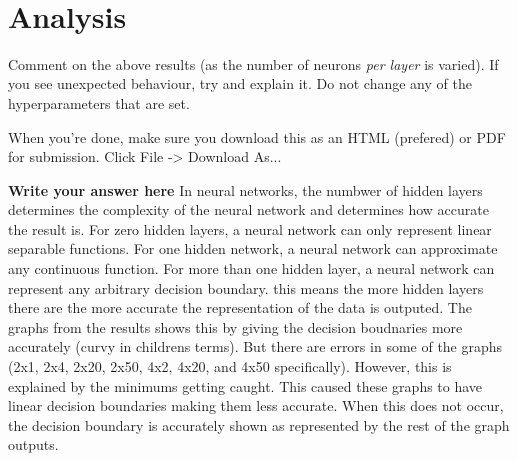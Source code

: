 \documentclass[11pt]{article}
\begin{document}
    \begin{center}
    \end{center}
    { \hspace*{\fill} \\}
    
    \section{Analysis}\label{analysis}

Comment on the above results (as the number of neurons \emph{per layer}
is varied). If you see unexpected behaviour, try and explain it. Do not
change any of the hyperparameters that are set.

When you're done, make sure you download this as an HTML (prefered) or
PDF for submission. Click File -\textgreater{} Download As...

    \textbf{Write your answer here} In neural networks, the numbwer of
hidden layers determines the complexity of the neural network and
determines how accurate the result is. For zero hidden layers, a neural
network can only represent linear separable functions. For one hidden
network, a neural network can approximate any continuous function. For
more than one hidden layer, a neural network can represent any arbitrary
decision boundary. this means the more hidden layers there are the more
accurate the representation of the data is outputed. The graphs from the
results shows this by giving the decision boudnaries more accurately
(curvy in childrens terms). But there are errors in some of the graphs
(2x1, 2x4, 2x20, 2x50, 4x2, 4x20, and 4x50 specifically). However, this
is explained by the minimums getting caught. This caused these graphs to
have linear decision boundaries making them less accurate. When this
does not occur, the decision boundary is accurately shown as represented
by the rest of the graph outputs.


    
    
    
    
\end{document}
